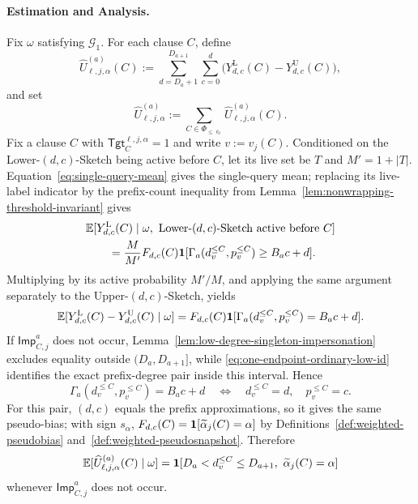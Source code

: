 \paragraph{Estimation and Analysis.}
Fix $\omega$ satisfying $\mathcal G_1$. For each clause $C$, define
\[
\widehat U^{(a)}_{\ell,j,\alpha}(C)
:=\sum_{d=D_a+1}^{D_{a+1}}\sum_{c=0}^{d}
\bigl(Y_{d,c}^{\mathrm L}(C)-Y_{d,c}^{\mathrm U}(C)\bigr),
\]
and set
\[
\widehat U^{(a)}_{\ell,j,\alpha}
:=\sum_{C\in\Phi_{\le\ell_0}}\widehat U^{(a)}_{\ell,j,\alpha}(C).
\]
Fix a clause $C$ with $\mathsf{Tgt}^{\ell,j,\alpha}_{C}=1$ and write $v:=v_j(C)$. Conditioned on the Lower-$(d,c)$-Sketch being active before $C$, let its live set be $T$ and $M'=1+|T|$. Equation~\eqref{eq:single-query-mean} gives the single-query mean; replacing its live-label indicator by the prefix-count inequality from Lemma~\ref{lem:nonwrapping-threshold-invariant} gives
\[
\begin{aligned}
&\mathbb E[Y_{d,c}^{\mathrm L}(C)\mid\omega,\ \text{Lower-$(d,c)$-Sketch active before }C]\\
&\qquad=\frac{M}{M'}F_{d,c}(C)
\1[\Gamma_a(d_v^{\le C},p_v^{\le C})\ge B_ac+d].
\end{aligned}
\]
Multiplying by its active probability $M'/M$, and applying the same argument separately to the Upper-$(d,c)$-Sketch, yields
\[
\mathbb E[Y_{d,c}^{\mathrm L}(C)-Y_{d,c}^{\mathrm U}(C)\mid\omega]
=F_{d,c}(C)\mathbf 1[\Gamma_a(d_v^{\le C},p_v^{\le C})=B_ac+d].
\]
If $\mathsf{Imp}^{a}_{C,j}$ does not occur, Lemma~\ref{lem:low-degree-singleton-impersonation} excludes equality outside $(D_a,D_{a+1}]$, while \eqref{eq:one-endpoint-ordinary-low-id} identifies the exact prefix-degree pair inside this interval. Hence
\[
\Gamma_a(d_v^{\le C},p_v^{\le C})=B_ac+d
\quad\Longleftrightarrow\quad
d_v^{\le C}=d,\quad p_v^{\le C}=c.
\]
For this pair, $(d,c)$ equals the prefix approximations, so it gives the same pseudo-bias; with sign $s_\alpha$, $F_{d,c}(C)=\mathbf 1[\widetilde\alpha_j(C)=\alpha]$ by Definitions~\ref{def:weighted-pseudobias} and~\ref{def:weighted-pseudosnapshot}. Therefore
\[
\mathbb E[\widehat U^{(a)}_{\ell,j,\alpha}(C)\mid\omega]
=\1[D_a<d_v^{\le C}\le D_{a+1},\ \widetilde\alpha_j(C)=\alpha]
\]
whenever $\mathsf{Imp}^{a}_{C,j}$ does not occur.

